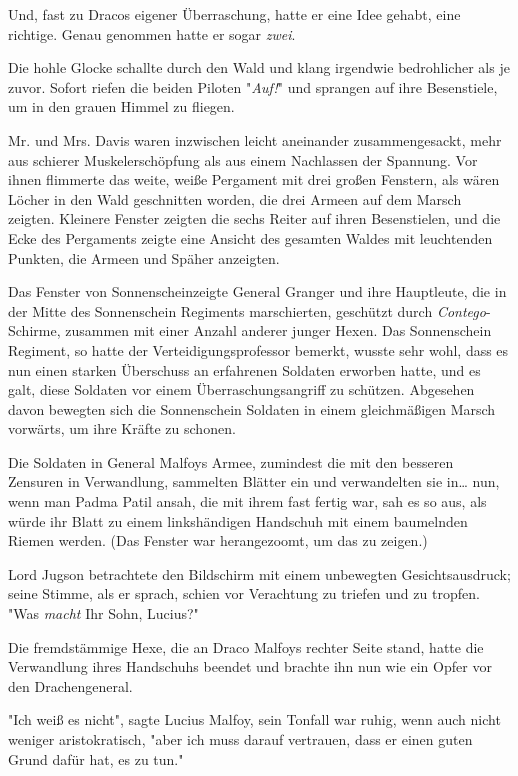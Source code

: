 {Und, fast zu Dracos eigener Überraschung, hatte er eine Idee gehabt, eine richtige. Genau genommen hatte er sogar \emph{zwei}.

Die hohle Glocke schallte durch den Wald und klang irgendwie bedrohlicher als je zuvor. Sofort riefen die beiden Piloten "\emph{Auf!}" und sprangen auf ihre Besenstiele, um in den grauen Himmel zu fliegen.

Mr. und Mrs. Davis waren inzwischen leicht aneinander zusammengesackt, mehr aus schierer Muskelerschöpfung als aus einem Nachlassen der Spannung. Vor ihnen flimmerte das weite, weiße Pergament mit drei großen Fenstern, als wären Löcher in den Wald geschnitten worden, die drei Armeen auf dem Marsch zeigten. Kleinere Fenster zeigten die sechs Reiter auf ihren Besenstielen, und die Ecke des Pergaments zeigte eine Ansicht des gesamten Waldes mit leuchtenden Punkten, die Armeen und Späher anzeigten.

Das Fenster von Sonnenscheinzeigte General Granger und ihre Hauptleute, die in der Mitte des Sonnenschein Regiments marschierten, geschützt durch \emph{Contego}-Schirme, zusammen mit einer Anzahl anderer junger Hexen. Das Sonnenschein Regiment, so hatte der Verteidigungsprofessor bemerkt, wusste sehr wohl, dass es nun einen starken Überschuss an erfahrenen Soldaten erworben hatte, und es galt, diese Soldaten vor einem Überraschungsangriff zu schützen. Abgesehen davon bewegten sich die Sonnenschein Soldaten in einem gleichmäßigen Marsch vorwärts, um ihre Kräfte zu schonen.

Die Soldaten in General Malfoys Armee, zumindest die mit den besseren Zensuren in Verwandlung, sammelten Blätter ein und verwandelten sie in… nun, wenn man Padma Patil ansah, die mit ihrem fast fertig war, sah es so aus, als würde ihr Blatt zu einem linkshändigen Handschuh mit einem baumelnden Riemen werden. (Das Fenster war herangezoomt, um das zu zeigen.)

Lord Jugson betrachtete den Bildschirm mit einem unbewegten Gesichtsausdruck; seine Stimme, als er sprach, schien vor Verachtung zu triefen und zu tropfen. "Was \emph{macht} Ihr Sohn, Lucius?"

Die fremdstämmige Hexe, die an Draco Malfoys rechter Seite stand, hatte die Verwandlung ihres Handschuhs beendet und brachte ihn nun wie ein Opfer vor den Drachengeneral.

"Ich weiß es nicht", sagte Lucius Malfoy, sein Tonfall war ruhig, wenn auch nicht weniger aristokratisch, "aber ich muss darauf vertrauen, dass er einen guten Grund dafür hat, es zu tun."

}
